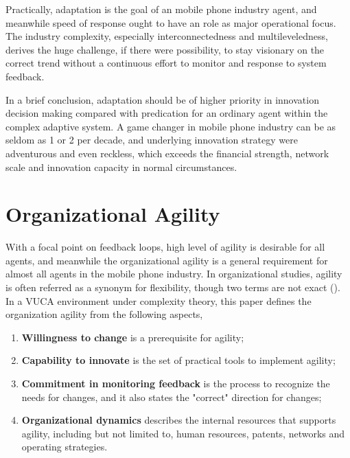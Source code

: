 \documentclass[utf8,english]{gradu3}
\begin{document}
Practically, adaptation is the goal of an mobile phone industry agent, and meanwhile speed of response ought to have an role as major operational focus. The industry complexity, especially interconnectedness and multileveledness, derives the huge challenge, if there were possibility, to stay visionary on the correct trend without a continuous effort to monitor and response to system feedback.

In a brief conclusion, adaptation should be of higher priority in innovation decision making compared with predication for an ordinary agent within the complex adaptive system. A game changer in mobile phone industry can be as seldom as 1 or 2 per decade, and underlying innovation strategy were adventurous and even reckless, which exceeds the financial strength, network scale and innovation capacity in normal circumstances.

\section{Organizational Agility}

With a focal point on feedback loops, high level of agility is desirable for all agents, and meanwhile the organizational agility is a general requirement for almost all agents in the mobile phone industry. In organizational studies, agility is often referred as a synonym for flexibility, though two terms are not exact (\cite{teece2016dynamic}). In a VUCA environment under complexity theory, this paper defines the organization agility from the following aspects,

\begin{enumerate}
\item \textbf{Willingness to change} is a prerequisite for agility; 
\item \textbf{Capability to innovate} is the set of practical tools to implement agility;
\item \textbf{Commitment in monitoring feedback} is the process to recognize the needs for changes, and it also states the "correct" direction for changes;
\item \textbf{Organizational dynamics} describes the internal resources that supports agility, including but not limited to, human resources, patents, networks and operating strategies. 
\end{enumerate}
\end{document}
